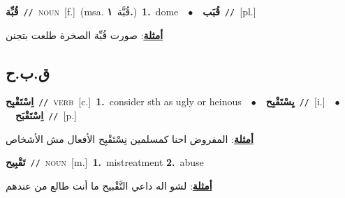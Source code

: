 \documentclass[10pt,a4paper,twoside]{article} %
\begin{document}
\begin{multicols}{2}
{{{\setlength\topsep{0pt}\textbf{\foreignlanguage{arabic}{قُبِّة}}\ {\color{gray}\texttt{//}\color{black}}\ \textsc{noun}\ [f.]\ \color{gray}(msa. \foreignlanguage{arabic}{قُبَّة}~\foreignlanguage{arabic}{\textbf{١.}})\color{black}\ \textbf{1.}~dome\ \ $\bullet$\ \ \setlength\topsep{0pt}\textbf{\foreignlanguage{arabic}{قُبَب}}\ {\color{gray}\texttt{//}\color{black}}\ [pl.]\  \begin{flushright}\color{gray}\foreignlanguage{arabic}{\textbf{\underline{\foreignlanguage{arabic}{أمثلة}}}: صورت قُبِّة الصخرة طلعت بتجنن}\end{flushright}\color{black}} \vspace{2mm}

\vspace{-3mm}
\subsection*{\color{blue}\foreignlanguage{arabic}{ق.ب.ح}\color{blue}{}} 

{\setlength\topsep{0pt}\textbf{\foreignlanguage{arabic}{اِسْتَقْبِح}}\ {\color{gray}\texttt{//}\color{black}}\ \textsc{verb}\ [c.]\ \textbf{1.}~consider sth as ugly or heinous\ \ $\bullet$\ \ \setlength\topsep{0pt}\textbf{\foreignlanguage{arabic}{يِسْتَقْبِح}}\ {\color{gray}\texttt{//}\color{black}}\ [i.]\ \ $\bullet$\ \ \setlength\topsep{0pt}\textbf{\foreignlanguage{arabic}{اِسْتَقْبَح}}\ {\color{gray}\texttt{//}\color{black}}\ [p.]\  \begin{flushright}\color{gray}\foreignlanguage{arabic}{\textbf{\underline{\foreignlanguage{arabic}{أمثلة}}}: المفروض احنا كمسلمين نِسْتَقْبِح الأفعال مش الأشخاص}\end{flushright}\color{black}} \vspace{2mm}

{\setlength\topsep{0pt}\textbf{\foreignlanguage{arabic}{تَقْبِيح}}\ {\color{gray}\texttt{//}\color{black}}\ \textsc{noun}\ [m.]\ \textbf{1.}~mistreatment  \textbf{2.}~abuse\  \begin{flushright}\color{gray}\foreignlanguage{arabic}{\textbf{\underline{\foreignlanguage{arabic}{أمثلة}}}: لشو اله داعي التَّقْبيح ما أنت طالع من عندهم}\end{flushright}\color{black}} \vspace{2mm}

}}
\end{multicols}
\end{document}

